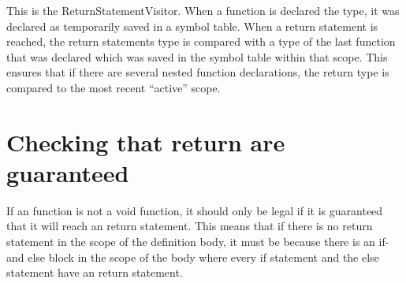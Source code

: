 This is the ReturnStatementVisitor. When a function is declared the type, it was declared as temporarily saved in a symbol table. When a return statement is reached, the return statements type is compared with a type of the last function that was declared which was saved in the symbol table within that scope. This ensures that if there are several nested function declarations, the return type is compared to the most recent “active” scope.

\noindent\newline


\noindent\newline

\section{Checking that return are guaranteed}
If an function is not a void function, it should only be legal if it is guaranteed that it will reach an return statement. This means that if there is no return statement in the scope of the definition body, it must be because there is an if- and else block in the scope of the body where every if statement and the else statement have an return statement. 

\noindent\newline


\noindent\newline


\noindent\newline